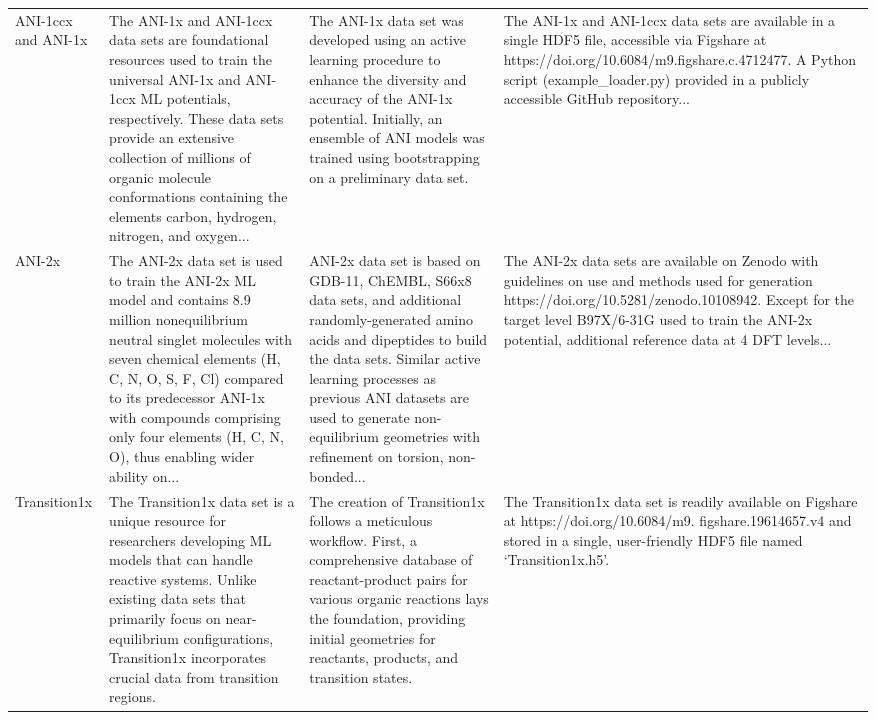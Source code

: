 \documentclass[12pt]{article}
\begin{document}
\begin{longtable}{p{}p{}p{}p{}}
ANI-1ccx and ANI-1x \cite{ds26-3} & The ANI-1x and ANI-1ccx data sets are foundational resources used to train the universal ANI-1x and ANI-1ccx ML potentials, respectively. These data sets provide an extensive collection of millions of organic molecule conformations containing the elements carbon, hydrogen, nitrogen, and oxygen... & The ANI-1x data set was developed using an active learning procedure to enhance the diversity and accuracy of the ANI-1x potential. Initially, an ensemble of ANI models was trained using bootstrapping on a preliminary data set. & The ANI-1x and ANI-1ccx data sets are available in a single HDF5 file, accessible via Figshare at https://doi.org/10.6084/m9.figshare.c.4712477. A Python script (example\_loader.py) provided in a publicly accessible GitHub repository... \cite{ds26-3} \\
ANI-2x \cite{ds27-3} & The ANI-2x data set is used to train the ANI-2x ML model and contains 8.9 million nonequilibrium neutral singlet molecules with seven chemical elements (H, C, N, O, S, F, Cl) compared to its predecessor ANI-1x with compounds comprising only four elements (H, C, N, O), thus enabling wider ability on... & ANI-2x data set is based on GDB-11, ChEMBL, S66x8 data sets, and additional randomly-generated amino acids and dipeptides to build the data sets. Similar active learning processes as previous ANI datasets are used to generate non-equilibrium geometries with refinement on torsion, non-bonded... & The ANI-2x data sets are available on Zenodo with guidelines on use and methods used for generation https://doi.org/10.5281/zenodo.10108942. Except for the target level B97X/6-31G used to train the ANI-2x potential, additional reference data at 4 DFT levels... \cite{ds27-145} \\
Transition1x \cite{ds28-47} & The Transition1x data set is a unique resource for researchers developing ML models that can handle reactive systems. Unlike existing data sets that primarily focus on near-equilibrium configurations, Transition1x incorporates crucial data from transition regions. & The creation of Transition1x follows a meticulous workflow. First, a comprehensive database of reactant-product pairs for various organic reactions lays the foundation, providing initial geometries for reactants, products, and transition states. & The Transition1x data set is readily available on Figshare at https://doi.org/10.6084/m9. figshare.19614657.v4 and stored in a single, user-friendly HDF5 file named `Transition1x.h5'. \cite{ds28-47} \\

\end{longtable}
\end{document}
